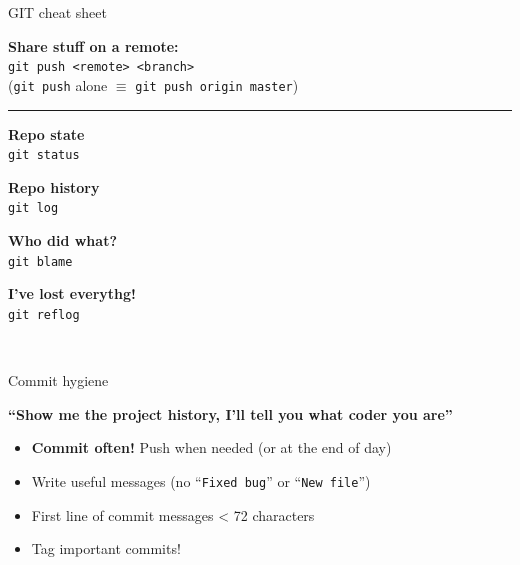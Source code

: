 \documentclass[compress]{beamer}
\begin{document}
\begin{frame}{GIT cheat sheet}
\begin{multicols}{2}
    {\bf Share stuff on a remote:}\\
    \texttt{git push <remote> <branch>}\\
    {\tiny (\texttt{git push} alone $\equiv$ \texttt{git push origin master})}\par

    \rule{\columnwidth}{0.2pt}

    \begin{multicols}{2}
    {\bf Repo state}\\
    \texttt{git status}\par

    {\bf Repo history}\\
    \texttt{git log}\par

    {\bf Who did what?}\\
    \texttt{git blame}\par

    {\bf I've lost everythg!}\\
    \texttt{git reflog}\par


    \end{multicols}

    ~\\

    \end{multicols}

\end{frame}

\begin{frame}{Commit hygiene}
    \centering

    {\bf ``Show me the project history, I'll tell you what coder you are''}

    \begin{itemize}
        \item<1> {\bf Commit often!} Push when needed (or at the end of day)
        \item<2> Write useful messages (no ``\texttt{Fixed bug}'' or ``\texttt{New
            file}'')
        \item<2> First line of commit messages < 72 characters
        \item<3> Tag important commits!
    \end{itemize}

\end{frame}
\end{document}
